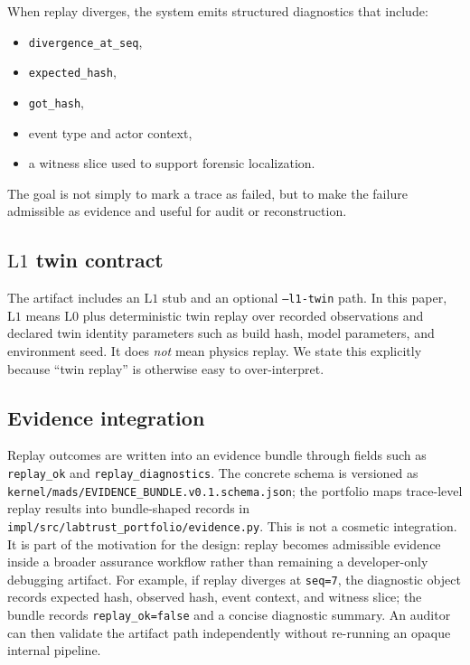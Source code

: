 \documentclass[11pt]{article}
\newcommand{\tool}[1]{\texttt{#1}}
\newcommand{\field}[1]{\texttt{#1}}
\newcommand{\code}[1]{\texttt{#1}}
\newcommand{\Lzero}{\ensuremath{\mathrm{L0}}}
\newcommand{\Lone}{\ensuremath{\mathrm{L1}}}
\begin{document}
When replay diverges, the system emits structured diagnostics that include:
\begin{itemize}[leftmargin=1.5em]
    \item \field{divergence\_at\_seq},
    \item \field{expected\_hash},
    \item \field{got\_hash},
    \item event type and actor context,
    \item a witness slice used to support forensic localization.
\end{itemize}

The goal is not simply to mark a trace as failed, but to make the failure admissible as evidence and useful for audit or reconstruction.

\subsection{\Lone{} twin contract}

The artifact includes an \Lone{} stub and an optional \tool{--l1-twin} path. In this paper, \Lone{} means \Lzero{} plus deterministic twin replay over recorded observations and declared twin identity parameters such as build hash, model parameters, and environment seed. It does \emph{not} mean physics replay. We state this explicitly because “twin replay” is otherwise easy to over-interpret.

\subsection{Evidence integration}

Replay outcomes are written into an evidence bundle through fields such as \field{replay\_ok} and \field{replay\_diagnostics}. The concrete schema is versioned as \code{kernel/mads/EVIDENCE\_BUNDLE.v0.1.schema.json}; the portfolio maps trace-level replay results into bundle-shaped records in \code{impl/src/labtrust\_portfolio/evidence.py}. This is not a cosmetic integration. It is part of the motivation for the design: replay becomes admissible evidence inside a broader assurance workflow rather than remaining a developer-only debugging artifact.
For example, if replay diverges at \field{seq=7}, the diagnostic object records expected hash, observed hash, event context, and witness slice; the bundle records \field{replay\_ok=false} and a concise diagnostic summary. An auditor can then validate the artifact path independently without re-running an opaque internal pipeline.
\end{document}
